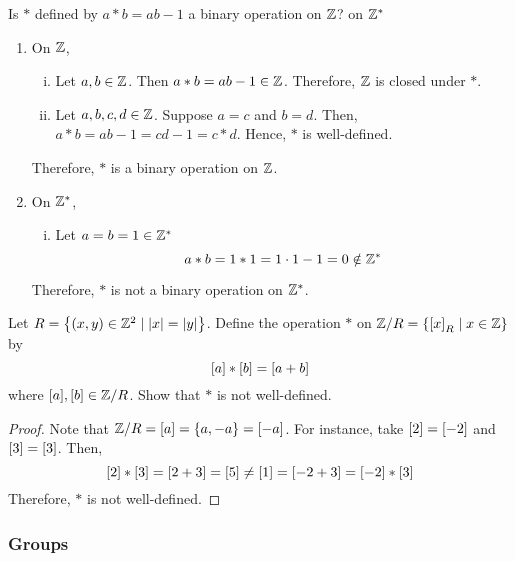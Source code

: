 \begin{exercise}
    Is $\ast$ defined by $a \ast b = ab - 1$ a binary operation on $\mathbb{Z}$? on $\mathbb{Z}^*$ 
\end{exercise}  

\begin{solution}  \phantom{blank}

\begin{enumerate}
    \item On $\mathbb{Z}$,
        \begin{enumerate}[i.]
            \item Let $a, b \in \mathbb{Z}$. Then $a \ast b = ab - 1 \in \mathbb{Z}$. Therefore, $\mathbb{Z}$ is closed under $\ast$.
            \item Let $a, b, c, d \in \mathbb{Z}$. Suppose $a = c$ and $b = d$. Then, $a \ast b = ab - 1 = cd - 1 = c \ast d$. Hence, $\ast$ is well-defined.
        \end{enumerate}
        Therefore, $\ast$ is a binary operation on $\mathbb{Z}$. \qedsymbol
    \item On $\mathbb{Z}^*$, 
        \begin{enumerate}[i.]
            \item Let $a = b = 1 \in \mathbb{Z}^*$
            \[ a \ast b = 1 \ast 1 = 1 \cdot 1 - 1 = 0 \notin \mathbb{Z}^* \]
        \end{enumerate}
        Therefore, $\ast$ is not a binary operation on $\mathbb{Z}^*$. \qedsymbol
\end{enumerate}

\end{solution}

\begin{exercise}
    Let $R = \qty{\qty(x, y) \in \mathbb{Z}^2 \mid \qty|x| = \qty|y|}$. Define the operation $\ast$ on $\mathbb{Z}/R = \qty{\qty[x]_R \mid x \in \mathbb{Z}}$ by 
    \[ \qty[a] \ast \qty[b] = \qty[a + b] \]
    where $\qty[a], \qty[b] \in \mathbb{Z}/R $. Show that $\ast$ is not well-defined.
\end{exercise}

\begin{proof}
    Note that $\mathbb{Z}/R = \qty[a] = \qty{a, -a} = \qty[-a]$.
    For instance, take $\qty[2] = \qty[-2]$ and $\qty[3] = \qty[3]$. Then,
    \[ \qty[2] \ast \qty[3] = \qty[2 + 3] = \qty[5] \neq \qty[1]  =  \qty[-2 + 3] = \qty[-2] \ast \qty[3] \]
    Therefore, $\ast$ is not well-defined. \qedsymbol
\end{proof}

\subsubsection{Groups}

